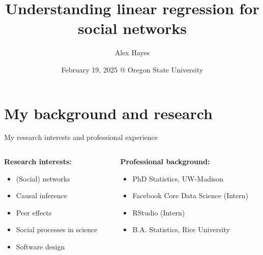 \documentclass[aspectratio=169]{beamer}
\title{Understanding linear regression for social networks}
\date{February 19, 2025 @ Oregon State University}
\author{Alex Hayes}
\institute{Department of Statistics\\University of Wisconsin-Madison}
\theoremstyle{remark}
\begin{document}
\maketitle

\section{My background and research}

\begin{frame}{My research interests and professional experience}
    \begin{columns}
        \begin{column}{0.5\textwidth}
            \textbf{Research interests:}
            \begin{itemize}
                \item (Social) networks
                \item Causal inference
                \item Peer effects
                \item Social processes in science
                \item Software design
            \end{itemize}
        \end{column}
        \begin{column}{0.5\textwidth}
            \textbf{Professional background:}
            \begin{itemize}
                \item PhD Statistics, UW-Madison
                \item Facebook Core Data Science (Intern)
                \item RStudio (Intern)
                \item B.A. Statistics, Rice University
            \end{itemize}
        \end{column}
    \end{columns}
\end{frame}
\end{document}
